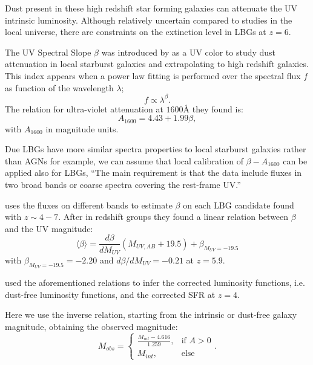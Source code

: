 \documentclass{emulateapj}
\begin{document}
Dust present in these high redshift star forming galaxies can
attenuate the UV intrinsic luminosity.
Although relatively uncertain compared to studies in the local
universe, there are constraints on the extinction level in LBGs at
$z=6$.

The UV Spectral Slope $\beta$ was introduced by \citet{Meurer99} as a UV color to 
study dust attenuation in local starburst galaxies and extrapolating to high redshift galaxies. 
This index appears when a power law fitting is performed over the spectral flux $f$ 
as function of the wavelength $\lambda$;
\[ f \propto \lambda^\beta.\]
The relation for ultra-violet attenuation at $1600 \textrm{\AA}$ they found is:
\begin{equation}
A_{1600} = 4.43 + 1.99 \beta,
\end{equation}
with $A_{1600}$ in magnitude units. 

Due LBGs have more similar spectra properties to local starburst galaxies rather than AGNs 
for example, we can assume that local calibration of $\beta-A_{1600}$ can be applied also 
for LBGs,
``The main requirement is that the data include fluxes in two broad bands or coarse spectra 
covering the rest-frame UV.''


\citet{Bouwens12} uses the fluxes on different bands to estimate $\beta$ on each LBG 
candidate found with $z \sim 4-7$. After in redshift groups they found a linear relation 
between $\beta$ and the UV magnitude:
\begin{equation}
\langle \beta \rangle = \frac{d \beta}{d M_{UV}} \left( M_{UV,AB}+19.5 \right) 
                                   + \beta_{M_{UV}=-19.5}
\end{equation}
with $ \beta_{M_{UV}=-19.5} = -2.20$ and $d \beta/d M_{UV} = -0.21$ at $z=5.9$.

\citet{Smit12} used the aforementioned relations to infer the corrected luminosity functions,
i.e. dust-free luminosity functions, and the corrected SFR at $z=4$. 

Here we use the inverse relation, starting from the intrinsic or dust-free galaxy magnitude, 
obtaining the observed magnitude:
\begin{equation}
  M_{obs} = \begin{cases} 
                         \frac{M_{int}-4.616}{1.259}, &\mbox{if } A>0 \\
                         M_{int}, &\mbox{else}
                   \end{cases}.
\label{eqn. dust attenuation}
\end{equation}
\end{document}
